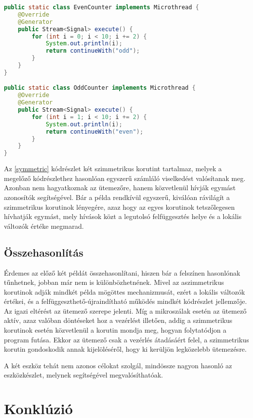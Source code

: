 \begin{lstlisting}[language=Java, caption={Számlálás szimmetrikus korutinokkal}, escapechar=!, captionpos=b, aboveskip=1em, label=symmetric]
public static class EvenCounter implements Microthread {
    @Override
    @Generator
    public Stream<Signal> execute() {
        for (int i = 0; i < 10; i += 2) {
            System.out.println(i);
            return continueWith("odd");
        }
    }
}

public static class OddCounter implements Microthread {
    @Override
    @Generator
    public Stream<Signal> execute() {
        for (int i = 1; i < 10; i += 2) {
            System.out.println(i);
            return continueWith("even");
        }
    }
}
\end{lstlisting} 

Az \ref{symmetric} kódrészlet két szimmetrikus korutint tartalmaz, melyek a megelőző kódrészlethez hasonlóan egyszerű számláló viselkedést valósítanak meg. Azonban nem hagyatkoznak az ütemezőre, hanem közvetlenül hívják egymást azonosítók segítségével. Bár a példa rendkívül egyszerű, kiválóan rávilágít a szimmetrikus korutinok lényegére, azaz hogy az egyes korutinok tetszőlegesen hívhatják egymást, mely hívások közt a legutolsó felfüggesztés helye és a lokális változók értéke megmarad.

\subsection{Összehasonlítás}

Érdemes az előző két példát összehasonlítani, hiszen bár a felszínen hasonlónak tűnhetnek, jobban már nem is különbözhetnének. Mivel az aszimmetrikus korutinok adják mindkét példa mögöttes mechanizmusát, ezért a lokális változók értékei, és a felfüggeszthető-újraindítható működés mindkét kódrészlet jellemzője. Az igazi eltérést az ütemező szerepe jelenti. Míg a mikroszálak esetén az ütemező aktív, azaz valóban döntéseket hoz a vezérlést illetően, addig a szimmetrikus korutinok esetén közvetlenül a korutin mondja meg, hogyan folytatódjon a program futása. Ekkor az ütemező csak a vezérlés átadásáért felel, a szimmetrikus korutin gondoskodik annak kijelöléséről, hogy ki kerüljön legközelebb ütemezésre.

A két eszköz tehát nem azonos célokat szolgál, mindössze nagyon hasonló az eszközkészlet, melynek segítségével megvalósíthatóak.

\section{Konklúzió}

